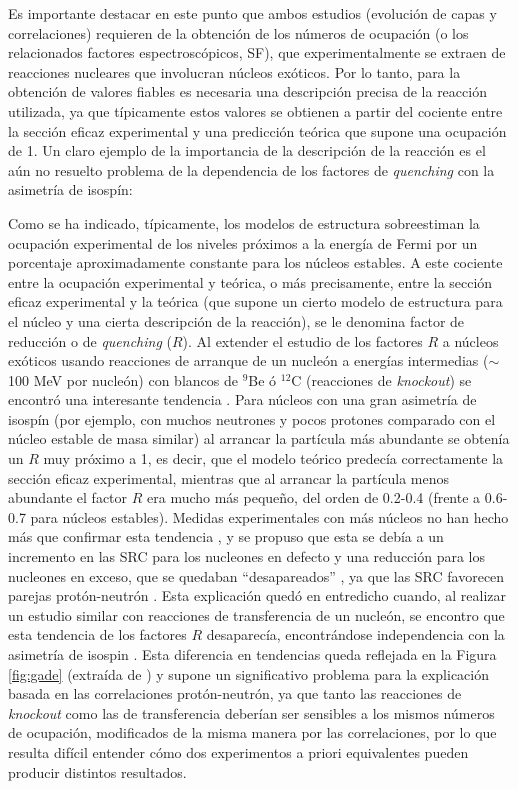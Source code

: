 \documentclass[a4paper,12pt,twoside]{article}
\begin{document}
Es importante destacar en este punto que ambos estudios (evolución de capas y correlaciones) requieren de la obtención de los números de ocupación (o los relacionados factores espectroscópicos, SF), que experimentalmente se extraen de reacciones nucleares que involucran núcleos exóticos. Por lo tanto, para la obtención de valores fiables es necesaria una descripción precisa de la reacción utilizada, ya que típicamente estos valores se obtienen a partir del cociente entre la sección eficaz experimental y una predicción teórica que supone una ocupación de 1. Un claro ejemplo de la importancia de la descripción de la reacción es el aún no resuelto problema de la dependencia de los factores de \textit{quenching} con la asimetría de isospín:

Como se ha indicado, típicamente, los modelos de estructura sobreestiman la ocupación experimental de los niveles próximos a la energía de Fermi por un porcentaje aproximadamente constante para los núcleos estables. A este cociente entre la ocupación experimental y teórica, o más precisamente, entre la sección eficaz experimental y la teórica (que supone un cierto modelo de estructura para el núcleo y una cierta descripción de la reacción), se le denomina factor de reducción o de \textit{quenching} ($R$). Al extender el estudio de los factores $R$ a núcleos exóticos usando reacciones de arranque de un nucleón a energías intermedias ($\sim$100 MeV por nucleón) con blancos de $^9$Be ó $^{12}$C (reacciones de \textit{knockout}) se encontró una interesante tendencia \cite{Gad08}. Para núcleos con una gran asimetría de isospín (por ejemplo, con muchos neutrones y pocos protones comparado con el núcleo estable de masa similar) al arrancar la partícula más abundante se obtenía un $R$ muy próximo a 1, es decir, que el modelo teórico predecía correctamente la sección eficaz experimental, mientras que al arrancar la partícula menos abundante el factor $R$ era mucho más pequeño, del orden de 0.2-0.4 (frente a 0.6-0.7 para núcleos estables). Medidas experimentales con más núcleos no han hecho más que confirmar esta tendencia \cite{Tos14,Tos21}, y se propuso que esta se debía a un incremento en las SRC para los nucleones en defecto y una reducción para los nucleones en exceso, que se quedaban ``desapareados'' \cite{Jen11}, ya que las SRC favorecen parejas protón-neutrón \cite{Pia06,Sub08}. Esta explicación quedó en entredicho cuando, al realizar un estudio similar con reacciones de transferencia de un nucleón, se encontro que esta tendencia de los factores $R$ desaparecía, encontrándose independencia con la asimetría de isospin \cite{Fla13,Kay13}. Esta diferencia en tendencias queda reflejada en la Figura \ref{fig:gade} (extraída de \cite{Kay22}) y supone un significativo problema para la explicación basada en las correlaciones protón-neutrón, ya que tanto las reacciones de \textit{knockout} como las de transferencia deberían ser sensibles a los mismos números de ocupación, modificados de la misma manera por las correlaciones, por lo que resulta difícil entender cómo dos experimentos a priori equivalentes pueden producir distintos resultados. 
\end{document}
